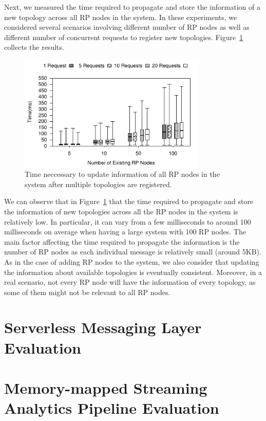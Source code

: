 Next, we measured the time required to propagate and store the information of a new topology across all RP nodes in the system. In these experiments, we considered several scenarios involving different number of RP nodes as well as different number of concurrent requests to register new topologies. Figure~\ref{fig:topology} collects the results. 

\begin{figure}[htb!]
  \centering
    \includegraphics[width=0.8\textwidth]{Figures/topologyBox.pdf}
  \caption{Time neccessary to update information of all RP nodes in the system after multiple topologies are registered.} \label{fig:topology}
    \vspace{-2ex}
\end{figure}

We can observe that in Figure~\ref{fig:topology} that the time required to propagate and store the information of new topologies across all the RP nodes in the system is relatively low. In particular, it can vary from a few milliseconds to around 100 milliseconds on average when having a large system with 100 RP nodes. The main factor affecting the time required to propagate the information is the number of RP nodes as each individual message is relatively small (around 5KB). As in the case of adding RP nodes to the system, we also consider that updating the information about available topologies is eventually consistent. Moreover, in a real scenario, not every RP node will have the information of every topology, as some of them might not be relevant to all RP nodes.

\section{Serverless Messaging Layer Evaluation}

\section{Memory-mapped Streaming Analytics Pipeline Evaluation}

